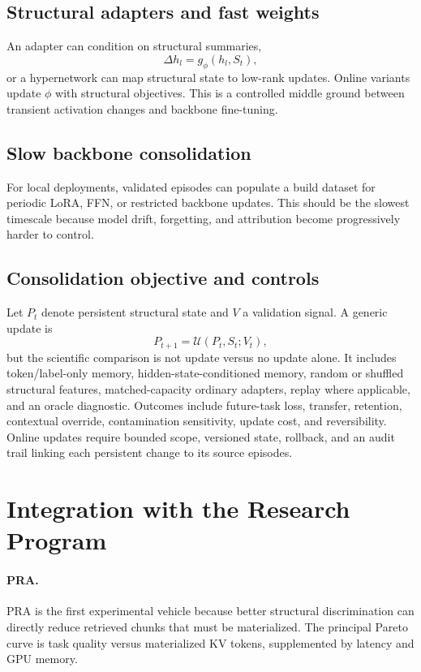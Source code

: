 \documentclass[11pt]{article}
\begin{document}
\subsection{Structural adapters and fast weights}
An adapter can condition on structural summaries,
\[
\Delta h_l=g_\phi(h_l,S_t),
\]
or a hypernetwork can map structural state to low-rank updates. Online variants update $\phi$ with structural objectives. This is a controlled middle ground between transient activation changes and backbone fine-tuning.

\subsection{Slow backbone consolidation}
For local deployments, validated episodes can populate a build dataset for periodic LoRA, FFN, or restricted backbone updates. This should be the slowest timescale because model drift, forgetting, and attribution become progressively harder to control.

\subsection{Consolidation objective and controls}
Let $P_t$ denote persistent structural state and $V$ a validation signal. A generic update is
\begin{equation}
P_{t+1}=\mathcal U(P_t,S_t;V_t),
\end{equation}
but the scientific comparison is not update versus no update alone. It includes token/label-only memory, hidden-state-conditioned memory, random or shuffled structural features, matched-capacity ordinary adapters, replay where applicable, and an oracle diagnostic. Outcomes include future-task loss, transfer, retention, contextual override, contamination sensitivity, update cost, and reversibility. Online updates require bounded scope, versioned state, rollback, and an audit trail linking each persistent change to its source episodes.

\section{Integration with the Research Program}
\paragraph{PRA.} PRA is the first experimental vehicle because better structural discrimination can directly reduce retrieved chunks that must be materialized. The principal Pareto curve is task quality versus materialized KV tokens, supplemented by latency and GPU memory.
\end{document}
